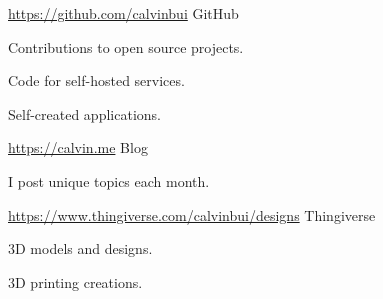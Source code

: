 

\begin{cventries}

  \cventry
  {\url{https://github.com/calvinbui}} %
  {GitHub} %
  {} %
  {} %
  {
    \begin{cvitems} %
      \item {Contributions to open source projects.}
      \item {Code for self-hosted services.}
      \item {Self-created applications.}
    \end{cvitems}
  }

  \cventry
  {\url{https://calvin.me}} %
  {Blog} %
  {} %
  {} %
  {
    \begin{cvitems} %
      \item {I post unique topics each month.}
    \end{cvitems}
  }

  \cventry
  {\url{https://www.thingiverse.com/calvinbui/designs}} %
  {Thingiverse} %
  {} %
  {} %
  {
    \begin{cvitems} %
      \item {3D models and designs.}
      \item {3D printing creations.}
    \end{cvitems}
  }

\end{cventries}
